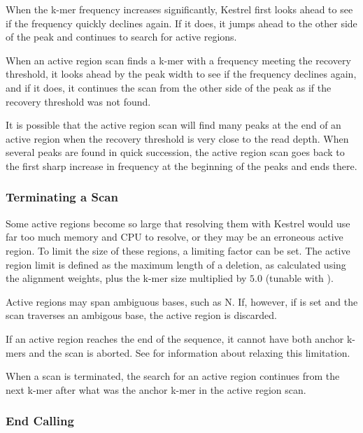 When the k-mer frequency increases significantly, Kestrel first looks ahead to see if the frequency quickly declines again. If it does, it jumps ahead to the other side of the peak and continues to search for active regions.

When an active region scan finds a k-mer with a frequency meeting the recovery threshold, it looks ahead by the peak width to see if the frequency declines again, and if it does, it continues the scan from the other side of the peak as if the recovery threshold was not found.

It is possible that the active region scan will find many peaks at the end of an active region when the recovery threshold is very close to the read depth. When several peaks are found in quick succession, the active region scan goes back to the first sharp increase in frequency at the beginning of the peaks and ends there.

\subsubsection{Terminating a Scan}
\label{sec.process.ardetect.terminate}

Some active regions become so large that resolving them with Kestrel would use far too much memory and CPU to resolve, or they may be an erroneous active region. To limit the size of these regions, a limiting factor can be set. The active region limit is defined as the maximum length of a deletion, as calculated using the alignment weights, plus the k-mer size multiplied by $5.0$ (tunable with ).

Active regions may span ambiguous bases, such as N. If, however, if  is set and the scan traverses an ambigous base, the active region is discarded.

If an active region reaches the end of the sequence, it cannot have both anchor k-mers and the scan is aborted. See  for information about relaxing this limitation.

When a scan is terminated, the search for an active region continues from the next k-mer after what was the anchor k-mer in the active region scan.

\subsubsection{End Calling}
\label{sec.process.ardetect.endcalling}


